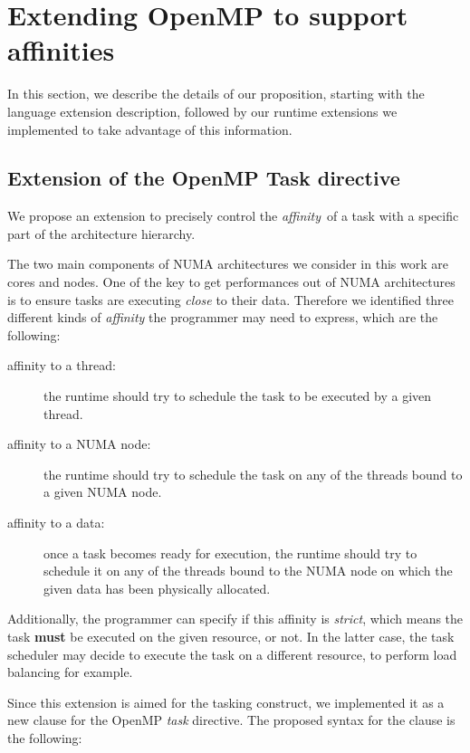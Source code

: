 \documentclass{Styles/llncs}
\begin{document}
\section{Extending OpenMP to support affinities}

In this section, we describe the details of our proposition, starting with the
language extension description, followed by our runtime extensions we implemented
to take advantage of this information.


\subsection{Extension of the OpenMP Task directive}

We propose an extension to precisely control the \emph{affinity} of a task with a specific part of the architecture hierarchy.

The two main components of NUMA architectures we consider in this work are cores and nodes. One of
the key to get performances out of NUMA architectures is to ensure tasks are
executing \emph{close} to their data.
Therefore we identified three different kinds of \emph{affinity} the programmer
may need to express, which are the following:
\begin{description}
    \item [affinity to a thread:]
      the runtime should try to schedule the task to be executed by a given thread.

    \item [affinity to a NUMA node:]
      the runtime should try to schedule the task on any of the threads bound to
      a given NUMA node.

    \item [affinity to a data:]
      once a task becomes ready for execution, the runtime should try to schedule it on any of the threads bound to the NUMA node on which the given data has been physically allocated.
\end{description}

Additionally, the programmer can specify if this affinity is \emph{strict}, which means the task \textbf{must} be executed on the given resource, or not. In the latter case, the task scheduler may decide to execute the task on a different resource, to perform load balancing for example.

Since this extension is aimed for the tasking construct, we implemented it as a new
clause for the OpenMP \emph{task} directive. The proposed syntax for the clause is the following:
\end{document}
